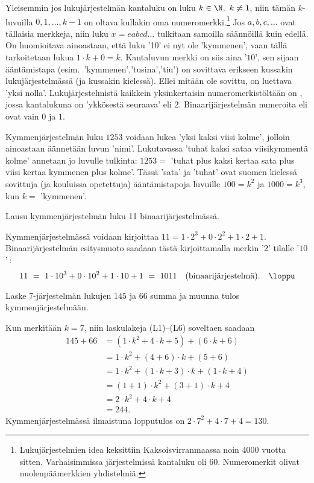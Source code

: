 Yleisemmin jos lukujärjestelmän kantaluku on luku $k \in \N,\ k\neq 1$, niin tämän 
$k$- luvuilla $0,1, \ldots, k-1$ on oltava kullakin oma 
numeromerkki.\footnote[2]{Lukujärjestelmien idea keksittiin Kaksoisvirranmaassa noin 4000 vuotta
sitten. Varhaisimmissa järjestelmissä kantaluku oli $60$. Numeromerkit olivat nuolenpäämerkkien
yhdistelmiä.} Jos $a,b,c, \ldots$ ovat tällaisia merkkeja, niin luku $x = eabcd \ldots$ 
tulkitaan samoilla säännöillä kuin edellä. On huomioitava ainoastaan, että luku '10' ei nyt ole
'kymmenen', vaan tällä tarkoitetaan lukua $1\cdot k + 0 = k$. Kantaluvun merkki on siis aina 
'$10$', sen sijaan ääntämistapa (esim.\ 'kymmenen','tusina','tiu') on sovittava erikseen 
kussakin lukujärjestelmässä (ja kussakin kielessä). Ellei mitään ole sovittu, on luettava 
'yksi nolla'. Lukujärjestelmistä kaikkein yksinkertaisin numeromerkistöltään on 
, jossa kantalukuna on 'ykkösestä seuraava' eli $2$. Binaarijärjestelmän
numeroita eli  ovat vain $0$ ja $1$.
\begin{Exa} Kymmenjärjestelmän luku $1253$ voidaan lukea 'yksi kaksi viisi kolme', jolloin 
ainoastaan äännetään luvun 'nimi'. Lukutavassa 'tuhat kaksi sataa viisikymmentä kolme' annetaan
jo luvulle tulkinta: $1253 = $ 'tuhat plus kaksi kertaa sata plus viisi kertaa kymmenen plus 
kolme'. Tässä 'sata' ja 'tuhat' ovat suomen kielessä sovittuja (ja kouluissa opetettuja) 
ääntämistapoja luvuille $100=k^2$ ja $1000=k^3$, kun $k =$ 'kymmenen'. \loppu 
\end{Exa}
\begin{Exa} Lausu kymmenjärjestelmän luku 11 binaarijärjestelmässä. \end{Exa}
\ratk Kymmenjärjestelmässä voidaan kirjoittaa $11 = 1 \cdot 2^3 + 0 \cdot 2^2 + 1 \cdot 2 + 1$. 
Binaarijärjestelmän esitysmuoto saadaan tästä kirjoittamalla merkin '$2$' tilalle '$10$'\,:
\[
11\ =\ 1 \cdot 10^3 + 0 \cdot 10^2 + 1 \cdot 10 + 1\ =\ 1011 \quad 
                                  \text{(binaarijärjestelmä)}. \quad \loppu
\]
\begin{Exa} Laske $7$-järjestelmän lukujen $145$ ja $66$ summa ja muunna tulos 
kymmenjärjestelmään. \end{Exa}
\ratk Kun merkitään $k=7$, niin laskulakeja (L1)--(L6) soveltaen saadaan
\begin{align*}
145+66 &= (1 \cdot k^2 + 4 \cdot k + 5) + (6 \cdot k + 6) \\
       &= 1 \cdot k^2 + (4+6) \cdot k + (5+6) \\
       &= 1 \cdot k^2 + (1 \cdot k + 3) \cdot k + (1 \cdot k + 4) \\
       &= (1+1) \cdot k^2 + (3+1) \cdot k + 4 \\
       &= 2 \cdot k^2 + 4 \cdot k + 4 \\
       &= 244.
\end{align*}
Kymmenjärjestelmässä ilmaistuna lopputulos on $2 \cdot 7^2 + 4 \cdot 7 + 4 = 130$. \loppu

